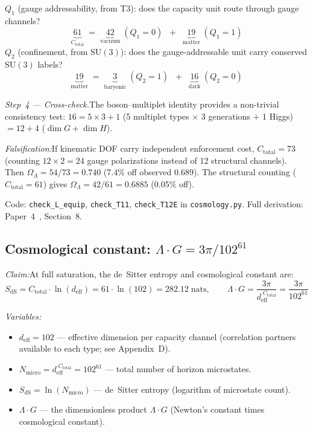 \documentclass[11pt]{article}
\newcommand{\Ctot}{C_{\mathrm{total}}}
\newcommand{\deff}{d_{\mathrm{eff}}}
\newcommand{\OmL}{\Omega_\Lambda}
\newcommand{\LG}{\Lambda \cdot G}
\newcommand{\SU}{\mathrm{SU}}
\newcommand{\nats}{\;\mathrm{nats}}
\begin{document}
\smallskip\noindent
$Q_1$ (gauge addressability, from T3): does the capacity unit route through gauge channels?
\begin{equation}
\underbrace{61}_{\Ctot} \;=\; \underbrace{42}_{\text{vacuum}}\;(Q_1{=}0) \;\;+\;\; \underbrace{19}_{\text{matter}}\;(Q_1{=}1)
\end{equation}
$Q_2$ (confinement, from $\SU(3)$): does the gauge-addressable unit carry conserved $\SU(3)$ labels?
\begin{equation}
\underbrace{19}_{\text{matter}} \;=\; \underbrace{3}_{\text{baryonic}}\;(Q_2{=}1) \;\;+\;\; \underbrace{16}_{\text{dark}}\;(Q_2{=}0)
\end{equation}

\textit{Step~4 --- Cross-check.}\quad The boson--multiplet identity provides a non-trivial consistency test: $16 = 5 \times 3 + 1$ (5 multiplet types $\times$ 3 generations $+$ 1 Higgs) $= 12 + 4$ ($\dim G + \dim H$).

\textit{Falsification:}\quad If kinematic DOF carry independent enforcement cost, $\Ctot = 73$ (counting $12 \times 2 = 24$ gauge polarizations instead of 12 structural channels).  Then $\OmL = 54/73 = 0.740$ (7.4\% off observed 0.689).  The structural counting ($\Ctot = 61$) gives $\OmL = 42/61 = 0.6885$ (0.05\% off).

Code: \texttt{check\_L\_equip}, \texttt{check\_T11}, \texttt{check\_T12E} in \texttt{cosmology.py}.  Full derivation: Paper~4~\cite{P4}, Section~8.


\subsection{Cosmological constant: \texorpdfstring{$\Lambda\cdot G = 3\pi/102^{61}$}{Λ·G = 3π/10²⁶¹}}

\begin{tcolorbox}[apfbox, title={T\_deSitter\_entropy: The Cosmological Constant from Horizon Microstates}]
\textit{Claim:}\quad At full saturation, the de~Sitter entropy and cosmological constant are:
\begin{equation}
S_{\mathrm{dS}} = \Ctot \cdot \ln(\deff) = 61 \cdot \ln(102) = 282.12\nats, \qquad \LG = \frac{3\pi}{\deff^{\;\Ctot}} = \frac{3\pi}{102^{61}}
\end{equation}

\smallskip\noindent\textit{Variables:}
\begin{itemize}[nosep,leftmargin=2em]
\item $\deff = 102$ --- effective dimension per capacity channel (correlation partners available to each type; see Appendix~D).
\item $N_{\mathrm{micro}} = \deff^{\;\Ctot} = 102^{61}$ --- total number of horizon microstates.
\item $S_{\mathrm{dS}} = \ln(N_{\mathrm{micro}})$ --- de~Sitter entropy (logarithm of microstate count).
\item $\LG$ --- the dimensionless product $\Lambda \cdot G$ (Newton's constant times cosmological constant).
\end{itemize}
\end{tcolorbox}
\end{document}
